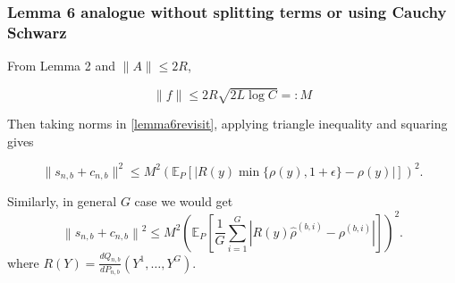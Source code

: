 \subsubsection*{Lemma 6 analogue without splitting terms or using Cauchy Schwarz}
From Lemma 2 and $\|A\|\leq 2R$,

$$\|f\| \leq 2 R \sqrt{2 L \log C}=:M$$

Then taking norms in \eqref{lemma6revisit}, applying triangle inequality and squaring gives

\begin{equation*}
    \|s_{n, b}+c_{n, b}\|^2 \leq M^2 \left(\mathbb{E}_P\left[|R(y) \min \{\rho(y), 1+\epsilon\}-\rho(y)|\right]\right)^2.
\end{equation*}

Similarly, in general $G$ case we would get 
\begin{equation*}
    \left\|s_{n, b}+c_{n, b}\right\|^2 \leq M^2\left(\mathbb{E}_P\left[\frac{1}{G} \sum_{i=1}^G\left|R(y) \hat{\rho}^{(b, i)}-\rho^{(b, i)}\right|\right]\right)^2 .
\end{equation*}
where $R(Y)=\frac{d Q_{n, b}}{d P_{n, b}}\left(Y^1, \ldots, Y^G\right)$.

